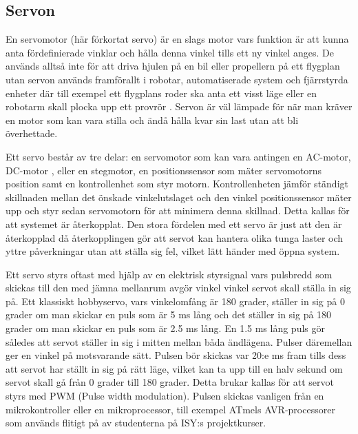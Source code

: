 \documentclass[a4paper,12pt]{article}
\begin{document}
\subsection{Servon}
 
En servomotor (här förkortat servo) är en slags motor vars funktion är att kunna anta fördefinierade  vinklar och hålla denna vinkel tills ett ny vinkel anges. De används alltså inte för att driva hjulen på en bil eller propellern på ett flygplan utan servon används framförallt i robotar, automatiserade system  och fjärrstyrda enheter där till exempel ett flygplans roder ska anta ett visst läge eller en robotarm skall plocka upp ett provrör . Servon är väl lämpade för när man kräver en motor som kan vara stilla och ändå hålla kvar sin last utan att bli överhettade. 
 
Ett servo består av tre delar: en servomotor som kan vara antingen en AC-motor, DC-motor , eller en stegmotor, en positionssensor som mäter servomotorns position samt en kontrollenhet som styr motorn.  Kontrollenheten jämför ständigt skillnaden mellan det önskade vinkelutslaget och den vinkel positionssensor mäter upp och styr sedan servomotorn för att minimera denna skillnad. Detta kallas för att systemet är återkopplat. Den stora fördelen med ett servo är just att den är återkopplad då återkopplingen gör att servot kan hantera olika tunga laster och yttre påverkningar utan att ställa sig fel, vilket lätt händer med öppna system. 
 
Ett servo styrs oftast  med hjälp av en elektrisk styrsignal vars pulsbredd som skickas till den med jämna mellanrum avgör vinkel vinkel servot skall ställa in sig på. Ett klassiskt hobbyservo, vars vinkelomfång är 180 grader, ställer in sig på 0 grader om man skickar en puls som är 5 ms lång och det ställer in sig på 180 grader om man skickar en puls som är 2.5 ms lång. En 1.5 ms lång puls gör således att servot ställer in sig i mitten mellan båda ändlägena. Pulser däremellan ger en vinkel på motsvarande sätt. Pulsen bör skickas var 20:e ms fram tills dess att servot har ställt in sig på rätt läge, vilket kan ta upp till en halv sekund om servot skall gå från 0 grader till 180 grader. Detta brukar kallas för att servot styrs med PWM (Pulse width modulation). Pulsen skickas vanligen från en mikrokontroller eller en mikroprocessor, till exempel ATmels AVR-processorer som används flitigt på av studenterna på ISY:s projektkurser.
 
\end{document}
